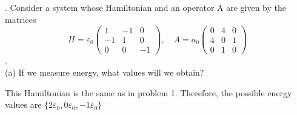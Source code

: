 \documentclass[a4paper, 11pt]{article}
\newenvironment{solution}{%
	\begin{list}{}{%
			\setlength{\topsep}{0pt}%
			\setlength{\leftmargin}{1.5cm}%
			\setlength{\rightmargin}{1.5cm}%
			\setlength{\listparindent}{\parindent}%
			\setlength{\itemindent}{\parindent}%
			\setlength{\parsep}{\parskip}%
		}%
		\item[]}{\end{list}}
\begin{document}
. Consider a system whose Hamiltonian and an operator A are given by the matrices\\ $$H = \varepsilon_0\begin{pmatrix}1 & -1 & 0 \\ -1 & 1 & 0 \\ 0 & 0 & -1\end{pmatrix}, \quad A=a_0\begin{pmatrix}0 & 4 & 0 \\ 4 & 0 & 1 \\ 0 & 1 & 0\end{pmatrix}$$.\\

\noindent(a) If we measure energy, what values will we obtain? \\
	\begin{solution}
		\noindent This Hamiltonian is the same as in problem 1. Therefore, the possible energy values are $\{2\varepsilon_0, 0\varepsilon_0, -1\varepsilon_0 \}$ \\ 
	\end{solution}
\end{document}

